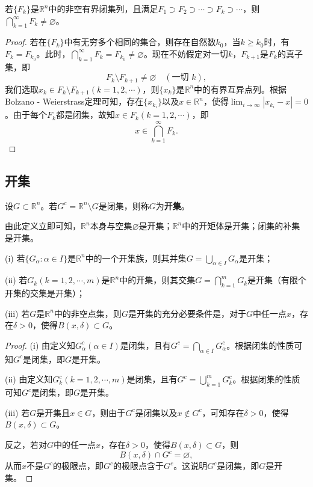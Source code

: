 \documentclass[lang=cn,newtx,10pt,scheme=chinese]{../Template/elegantbook}
\begin{document}
\begin{theorem}[Cantor闭集套定理]\label{theorem:Cantor闭集套定理}
若\(\{F_k\}\)是\(\mathbb{R}^n\)中的非空有界闭集列，且满足\(F_1\supset F_2\supset\cdots\supset F_k\supset\cdots\)，则\(\bigcap_{k = 1}^{\infty}F_k\neq\varnothing\)。
\end{theorem}
\begin{proof}
  若在\(\{F_k\}\)中有无穷多个相同的集合，则存在自然数\(k_0\)，当\(k\geqslant k_0\)时，有\(F_k = F_{k_0}\)。此时，\(\bigcap_{k = 1}^{\infty}F_k = F_{k_0}\neq\varnothing\)。现在不妨假定对一切\(k\)，\(F_{k + 1}\)是\(F_k\)的真子集，即
\[F_k\setminus F_{k + 1}\neq\varnothing\quad (\text{一切 }k),\]
我们选取\(x_k\in F_k\setminus F_{k + 1}(k = 1,2,\cdots)\)，则\(\{x_k\}\)是\(\mathbb{R}^n\)中的有界互异点列。根据Bolzano - Weierstrass定理可知，存在\(\{x_{k_i}\}\)以及\(x\in\mathbb{R}^n\)，使得\(\lim_{i\rightarrow\infty}|x_{k_i}-x| = 0\)。由于每个\(F_k\)都是闭集，故知\(x\in F_k(k = 1,2,\cdots)\)，即
\[x\in\bigcap_{k = 1}^{\infty}F_k.\]
\end{proof}

\subsection{开集}

\begin{definition}[开集]\label{definition:开集}
设\(G\subset\mathbb{R}^n\)。若\(G^c=\mathbb{R}^n\setminus G\)是闭集，则称\(G\)为\textbf{开集}。
\end{definition}
\begin{note}
  由此定义立即可知，\(\mathbb{R}^n\)本身与空集\(\varnothing\)是开集；\(\mathbb{R}^n\)中的开矩体是开集；闭集的补集是开集。
\end{note}

\begin{theorem}[开集的运算性质]\label{theorem:开集的运算性质}
(i) 若\(\{G_{\alpha}:\alpha\in I\}\)是\(\mathbb{R}^n\)中的一个开集族，则其并集\(G = \bigcup_{\alpha\in I}G_{\alpha}\)是开集；

(ii) 若\(G_k(k = 1,2,\cdots,m)\)是\(\mathbb{R}^n\)中的开集，则其交集\(G=\bigcap_{k = 1}^{m}G_k\)是开集（有限个开集的交集是开集）；

(iii) 若\(G\)是\(\mathbb{R}^n\)中的非空点集，则\(G\)是开集的充分必要条件是，对于\(G\)中任一点\(x\)，存在\(\delta>0\)，使得\(B(x,\delta)\subset G\)。
\end{theorem}
\begin{proof}
  (i) 由定义知\(G_{\alpha}^c(\alpha\in I)\)是闭集，且有\(G^c=\bigcap_{\alpha\in I}G_{\alpha}^c\)。根据闭集的性质可知\(G^c\)是闭集，即\(G\)是开集。

(ii) 由定义知\(G_k^c(k = 1,2,\cdots,m)\)是闭集，且有\(G^c=\bigcup_{k = 1}^{m}G_k^c\)。根据闭集的性质可知\(G^c\)是闭集，即\(G\)是开集。

(iii) 若\(G\)是开集且\(x\in G\)，则由于\(G^c\)是闭集以及\(x\notin G^c\)，可知存在\(\delta>0\)，使得\(B(x,\delta)\subset G\)。

反之，若对\(G\)中的任一点\(x\)，存在\(\delta>0\)，使得\(B(x,\delta)\subset G\)，则
\[B(x,\delta)\cap G^c=\varnothing,\]
从而\(x\)不是\(G^c\)的极限点，即\(G^c\)的极限点含于\(G^c\)。这说明\(G^c\)是闭集，即\(G\)是开集。
\end{proof}
\end{document}

